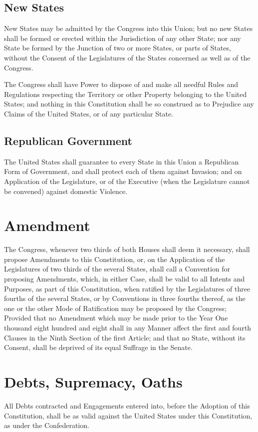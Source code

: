 \documentclass{constitution}
\begin{document}
\section{New States}
New States may be admitted by the Congress into this Union;
but no new States shall be formed or erected within the Jurisdiction of any other State;
nor any State be formed by the Junction of two or more States, or parts of States,
without the Consent of the Legislatures of the States concerned as well as of the Congress.

The Congress shall have Power to dispose of and make all needful Rules and Regulations
respecting the Territory or other Property belonging to the United States;
and nothing in this Constitution shall be so construed
as to Prejudice any Claims of the United States, or of any particular State.

\section{Republican Government}
The United States shall guarantee to every State in this Union
a Republican Form of Government,
and shall protect each of them against Invasion;
and on Application of the Legislature,
or of the Executive (when the Legislature cannot be convened)
against domestic Violence.

\chapter{Amendment}
The Congress, whenever two thirds of both Houses shall deem it necessary,
shall propose Amendments to this Constitution,
or, on the Application of the Legislatures of two thirds of the several States,
shall call a Convention for proposing Amendments,
which, in either Case, shall be valid to all Intents and Purposes, as part of this Constitution,
when ratified by the Legislatures of three fourths of the several States,
or by Conventions in three fourths thereof,
as the one or the other Mode of Ratification may be proposed by the Congress;
Provided that no Amendment which may be made
prior to the Year One thousand eight hundred and eight
shall in any Manner affect the first and fourth Clauses in the Ninth Section of the first Article;
and that no State, without its Consent, shall be deprived of its equal Suffrage in the Senate.

\chapter{Debts, Supremacy, Oaths}
All Debts contracted and Engagements entered into, before the Adoption of this Constitution,
shall be as valid against the United States under this Constitution, as under the Confederation.
\end{document}
